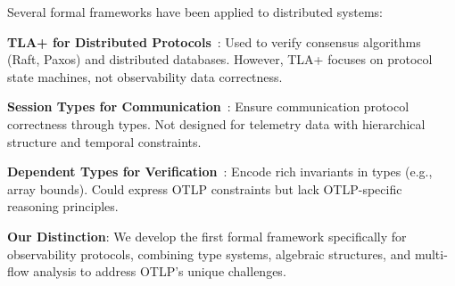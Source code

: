 Several formal frameworks have been applied to distributed systems:

\textbf{TLA+ for Distributed Protocols}~\cite{lamport2002specifying}: Used to verify consensus algorithms (Raft, Paxos) and distributed databases. However, TLA+ focuses on protocol state machines, not observability data correctness.

\textbf{Session Types for Communication}~\cite{honda1993types,honda2008multiparty}: Ensure communication protocol correctness through types. Not designed for telemetry data with hierarchical structure and temporal constraints.

\textbf{Dependent Types for Verification}~\cite{xi1999dependent}: Encode rich invariants in types (e.g., array bounds). Could express OTLP constraints but lack OTLP-specific reasoning principles.

\textbf{Our Distinction}: We develop the first formal framework specifically for observability protocols, combining type systems, algebraic structures, and multi-flow analysis to address OTLP's unique challenges.
